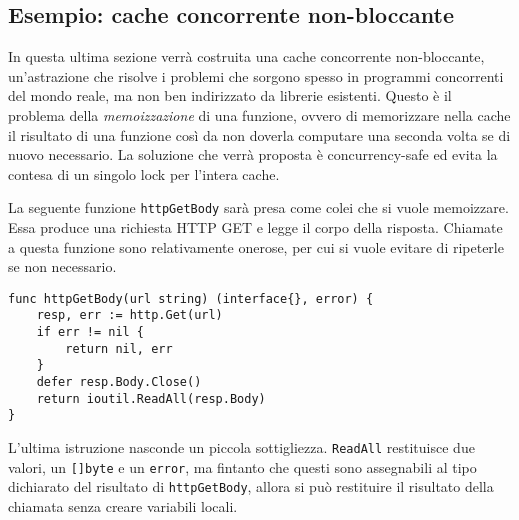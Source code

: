 \documentclass[../../thesis.tex]{subfiles}
\begin{document}
    \subsection{Esempio: cache concorrente non-bloccante}\label{subsec:esempio:-cache-concorrente-non-bloccante}
    In questa ultima sezione verrà costruita una cache concorrente non-bloccante, un'astrazione che risolve i problemi che sorgono spesso in programmi concorrenti del mondo reale, ma non ben indirizzato da librerie esistenti.
    Questo è il problema della \textit{memoizzazione} di una funzione, ovvero di memorizzare nella cache il risultato di una funzione così da non doverla computare una seconda volta se di nuovo necessario.
    La soluzione che verrà proposta è concurrency-safe ed evita la contesa di un singolo lock per l'intera cache.
    \hfill \vspace{12pt}

    La seguente funzione \verb"httpGetBody" sarà presa come colei che si vuole memoizzare.
    Essa produce una richiesta HTTP GET e legge il corpo della risposta.
    Chiamate a questa funzione sono relativamente onerose, per cui si vuole evitare di ripeterle se non necessario.
    \begin{lstlisting}[frame = single, label = {lst:lstlisting9-7.1}]
func httpGetBody(url string) (interface{}, error) {
    resp, err := http.Get(url)
    if err != nil {
        return nil, err
    }
    defer resp.Body.Close()
    return ioutil.ReadAll(resp.Body)
}
    \end{lstlisting}
    L'ultima istruzione nasconde un piccola sottigliezza. \verb"ReadAll" restituisce due valori, un \verb"[]byte" e un \verb"error", ma fintanto che questi sono assegnabili al tipo dichiarato del risultato di \verb"httpGetBody", allora si può restituire il risultato della chiamata senza creare variabili locali.
    \hfill \vspace{12pt}
\end{document}

